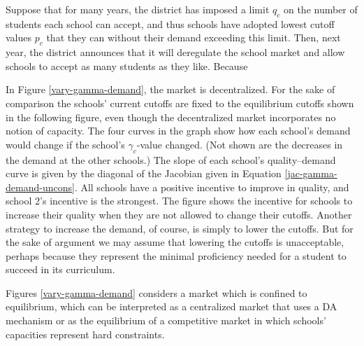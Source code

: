 \documentclass[12pt]{article}
\theoremstyle{definition}
\begin{document}
Suppose that for many years, the district has imposed a limit $q_c$ on the number of students each school can accept, and thus schools have adopted lowest cutoff values $p_c$ that they can without their demand exceeding this limit. Then, next year, the district announces that it will deregulate the school market and allow schools to accept as many students as they like. Because 

In Figure \ref{vary-gamma-demand}, the market is decentralized. For the sake of comparison the schools' current cutoffs are fixed to the equilibrium cutoffs shown in the following figure, even though the decentralized market incorporates no notion of capacity. 
The four curves in the graph show how each school's demand would change if the school's $\gamma_c$-value changed. (Not shown are the decreases in the demand at the other schools.) The slope of each school's quality--demand curve is given by the diagonal of the Jacobian given in Equation \eqref{jac-gamma-demand-uncons}. All schools have a positive incentive to improve in quality, and school 2's incentive is the strongest.
The figure shows the incentive for schools to increase their quality when they are not allowed to change their cutoffs. Another strategy to increase the demand, of course, is simply to lower the cutoffs. But for the sake of argument we may assume that lowering the cutoffs is unacceptable, perhaps because they represent the minimal proficiency needed for a student to succeed in its curriculum. 

Figures \ref{vary-gamma-demand} considers a market which is confined to equilibrium, which can be interpreted as a centralized market that uses a DA mechanism or as the equilibrium of a competitive market in which schools' capacities represent hard constraints.
\end{document}

